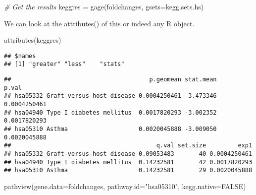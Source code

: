 \documentclass[
]{article}
\newenvironment{Shaded}{\begin{snugshade}}{\end{snugshade}}
\newcommand{\AttributeTok}[1]{\textcolor[rgb]{0.77,0.63,0.00}{#1}}
\newcommand{\CommentTok}[1]{\textcolor[rgb]{0.56,0.35,0.01}{\textit{#1}}}
\newcommand{\ConstantTok}[1]{\textcolor[rgb]{0.00,0.00,0.00}{#1}}
\newcommand{\DecValTok}[1]{\textcolor[rgb]{0.00,0.00,0.81}{#1}}
\newcommand{\FunctionTok}[1]{\textcolor[rgb]{0.00,0.00,0.00}{#1}}
\newcommand{\NormalTok}[1]{#1}
\newcommand{\OtherTok}[1]{\textcolor[rgb]{0.56,0.35,0.01}{#1}}
\newcommand{\SpecialCharTok}[1]{\textcolor[rgb]{0.00,0.00,0.00}{#1}}
\newcommand{\StringTok}[1]{\textcolor[rgb]{0.31,0.60,0.02}{#1}}
\begin{document}
\begin{Shaded}
\begin{Highlighting}[]
\CommentTok{\# Get the results}
\NormalTok{keggres }\OtherTok{=} \FunctionTok{gage}\NormalTok{(foldchanges, }\AttributeTok{gsets=}\NormalTok{kegg.sets.hs)}
\end{Highlighting}
\end{Shaded}

We can look at the attributes() of this or indeed any R object.

\begin{Shaded}
\begin{Highlighting}[]
\FunctionTok{attributes}\NormalTok{(keggres)}
\end{Highlighting}
\end{Shaded}

\begin{verbatim}
## $names
## [1] "greater" "less"    "stats"
\end{verbatim}

\begin{Shaded}
\end{Shaded}

\begin{verbatim}
##                                       p.geomean stat.mean        p.val
## hsa05332 Graft-versus-host disease 0.0004250461 -3.473346 0.0004250461
## hsa04940 Type I diabetes mellitus  0.0017820293 -3.002352 0.0017820293
## hsa05310 Asthma                    0.0020045888 -3.009050 0.0020045888
##                                         q.val set.size         exp1
## hsa05332 Graft-versus-host disease 0.09053483       40 0.0004250461
## hsa04940 Type I diabetes mellitus  0.14232581       42 0.0017820293
## hsa05310 Asthma                    0.14232581       29 0.0020045888
\end{verbatim}

\begin{Shaded}
\begin{Highlighting}[]
\FunctionTok{pathview}\NormalTok{(}\AttributeTok{gene.data=}\NormalTok{foldchanges, }\AttributeTok{pathway.id=}\StringTok{"hsa05310"}\NormalTok{, }\AttributeTok{kegg.native=}\ConstantTok{FALSE}\NormalTok{)}
\end{Highlighting}
\end{Shaded}
\end{document}
